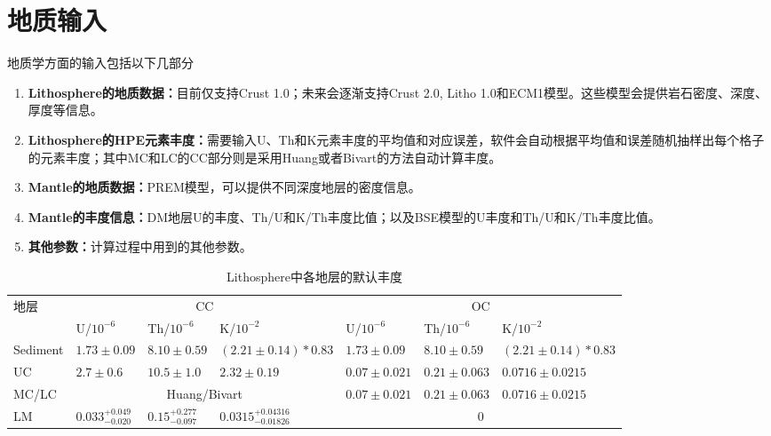 		\section{地质输入}
			地质学方面的输入包括以下几部分
				\begin{enumerate}
					\item \textbf{Lithosphere的地质数据：}目前仅支持Crust 1.0；未来会逐渐支持Crust 2.0, Litho 1.0和ECM1模型。这些模型会提供岩石密度、深度、厚度等信息。
					\item \textbf{Lithosphere的HPE元素丰度：}需要输入U、Th和K元素丰度的平均值和对应误差，软件会自动根据平均值和误差随机抽样出每个格子的元素丰度；其中MC和LC的CC部分则是采用Huang或者Bivart的方法自动计算丰度。
					\item \textbf{Mantle的地质数据：}PREM模型，可以提供不同深度地层的密度信息。
					\item \textbf{Mantle的丰度信息：}DM地层U的丰度、Th/U和K/Th丰度比值；以及BSE模型的U丰度和Th/U和K/Th丰度比值。
					\item \textbf{其他参数：}计算过程中用到的其他参数。
				\end{enumerate}
				\begin{table}[H]
					\centering
					\caption{Lithosphere中各地层的默认丰度}
					\renewcommand{\arraystretch}{1.2} %
					\begin{tabular}{p{1.5cm}|p{2cm}p{2cm}p{3cm}|p{2cm}p{2cm}p{3cm}}
						\hline
						\hline
						\multirow{2}{*}{地层} & \multicolumn{3}{c|}{CC} & \multicolumn{3}{c}{OC} \\  
						\cline{2-7}
						& U/$10^{-6}$ & Th/$10^{-6}$ & K/$10^{-2}$ & U/$10^{-6}$ & Th/$10^{-6}$ & K/$10^{-2}$\\
						\hline
						Sediment & $1.73\pm 0.09$ & $8.10\pm 0.59$ & $(2.21 \pm 0.14)* 0.83$ & $1.73 \pm 0.09$ & $8.10 \pm 0.59$ & $(2.21 \pm 0.14) * 0.83$\\
						\hline
						UC & $2.7 \pm 0.6$ & $10.5 \pm 1.0$ & $2.32 \pm 0.19$ & $0.07\pm 0.021$ & $0.21 \pm 0.063$ & $0.0716 \pm 0.0215$\\
						\hline
						MC/LC & \multicolumn{3}{c|}{Huang/Bivart} & $0.07 \pm 0.021$ & $0.21 \pm 0.063$ & $0.0716 \pm 0.0215$ \\
						\hline
						LM & $0.033^{+0.049}_{-0.020}$ & $0.15^{+0.277}_{-0.097}$ & $0.0315^{+0.04316}_{-0.01826}$ & \multicolumn{3}{c}{$0$} \\
						\hline
						\hline
					\end{tabular}
					\label{Table: Lithosphere Default Abundance Input}
				\end{table}
